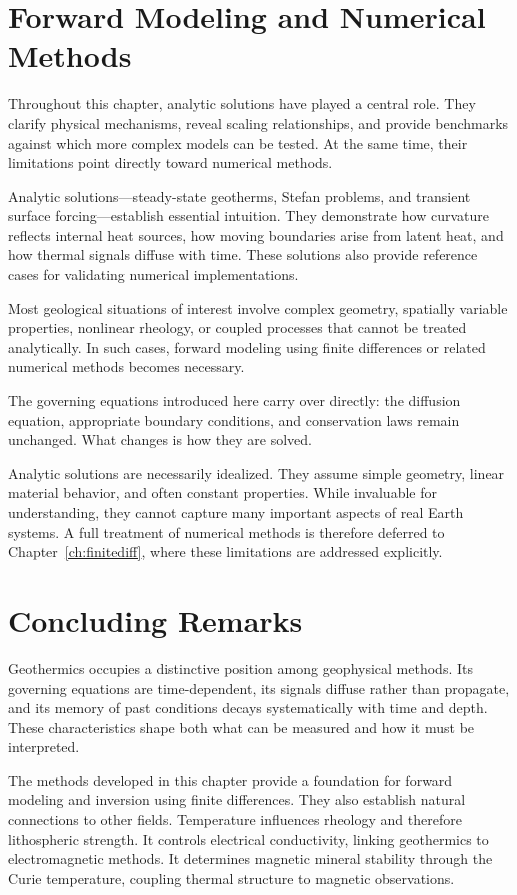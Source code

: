 \section{Forward Modeling and Numerical Methods}

Throughout this chapter, analytic solutions have played a central role. They clarify physical mechanisms, reveal scaling relationships, and provide benchmarks against which more complex models can be tested. At the same time, their limitations point directly toward numerical methods.

Analytic solutions---steady-state geotherms, Stefan problems, and transient surface forcing---establish essential intuition. They demonstrate how curvature reflects internal heat sources, how moving boundaries arise from latent heat, and how thermal signals diffuse with time. These solutions also provide reference cases for validating numerical implementations.

Most geological situations of interest involve complex geometry, spatially variable properties, nonlinear rheology, or coupled processes that cannot be treated analytically. In such cases, forward modeling using finite differences or related numerical methods becomes necessary.

The governing equations introduced here carry over directly: the diffusion equation, appropriate boundary conditions, and conservation laws remain unchanged. What changes is how they are solved.

Analytic solutions are necessarily idealized. They assume simple geometry, linear material behavior, and often constant properties. While invaluable for understanding, they cannot capture many important aspects of real Earth systems. A full treatment of numerical methods is therefore deferred to Chapter~\ref{ch:finitediff}, where these limitations are addressed explicitly.

\section{Concluding Remarks}

Geothermics occupies a distinctive position among geophysical methods. Its governing equations are time-dependent, its signals diffuse rather than propagate, and its memory of past conditions decays systematically with time and depth. These characteristics shape both what can be measured and how it must be interpreted.

The methods developed in this chapter provide a foundation for forward modeling and inversion using finite differences. They also establish natural connections to other fields. Temperature influences rheology and therefore lithospheric strength. It controls electrical conductivity, linking geothermics to electromagnetic methods. It determines magnetic mineral stability through the Curie temperature, coupling thermal structure to magnetic observations.

